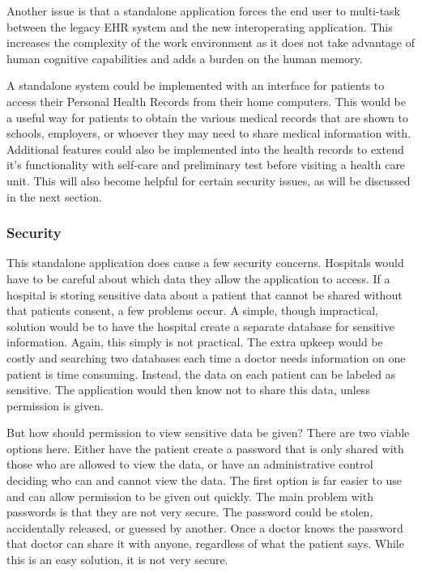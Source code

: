 \documentclass[14pt]{article}
\begin{document}
Another issue is that a standalone application forces the end user to multi-task between the legacy EHR system and the new interoperating application. This increases the complexity of the work environment as it does not take advantage of human cognitive capabilities and adds a burden on the human memory.

A standalone system could be implemented with an interface for patients to access their Personal Health Records from their home computers. This would be a useful way for patients to obtain the various medical records that are shown to schools, employers, or whoever they may need to share medical information with. Additional features could also be implemented into the health records to extend it’s functionality with self-care and preliminary test before visiting a health care unit. This will also become helpful for certain security issues, as will be discussed in the next section.

\subsubsection{Security}
This standalone application does cause a few security concerns. Hospitals would have to be careful about which data they allow the application to access. If a hospital is storing sensitive data about a patient that cannot be shared without that patients consent, a few problems occur. A simple, though impractical, solution would be to have the hospital create a separate database for sensitive information. Again, this simply is not practical. The extra upkeep would be costly and searching two databases each time a doctor needs information on one patient is time consuming. Instead, the data on each patient can be labeled as sensitive. The application would then know not to share this data, unless permission is given.

 But how should permission to view sensitive data be given? There are two viable options here. Either have the patient create a password that is only shared with those who are allowed to view the data, or have an administrative control deciding who can and cannot view the data. The first option is far easier to use and can allow permission to be given out quickly. The main problem with passwords is that they are not very secure. The password could be stolen, accidentally released, or guessed by another. Once a doctor knows the password that doctor can share it with anyone, regardless of what the patient says. While this is an easy solution, it is not very secure. 
\end{document}
